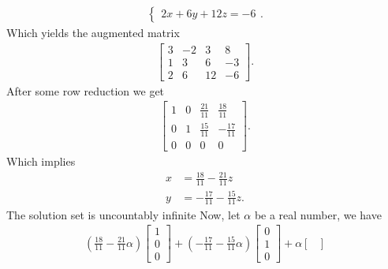 \documentclass{report}
\begin{document}
\begin{itemize}
\begin{align*}
\begin{cases}
                  2x + 6y + 12z = -6
               \end{cases}
            .\end{align*}
            Which yields the augmented matrix
            \begin{align*}
                \left[
                    \begin{array}{ccc|c}
                        3 & -2 & 3  & 8 \\
                        1 & 3 & 6 & -3 \\
                        2 & 6 & 12 & -6
                    \end{array}
                \right]
            .\end{align*}
            After some row reduction we get
            \begin{align*}
                \left[
                    \begin{array}{ccc|c}
                        1 & 0 & \frac{21}{11} & \frac{18}{11} \\
                        0 & 1 & \frac{15}{11} & -\frac{17}{11} \\
                        0 & 0 & 0 & 0 
                    \end{array}
                \right]
            .\end{align*}
            Which implies 
            \begin{align*}
                x &= \frac{18}{11} - \frac{21}{11}z \\
                y &= -\frac{17}{11}-\frac{15}{11}z
            .\end{align*}
            The solution set is uncountably infinite
            \bigbreak \noindent 
            Now, let $\alpha$ be a real number, we have
            \begin{align*}
                \left(\frac{18}{11} - \frac{21}{11}\alpha\right)
                \begin{bmatrix}
                    1 \\ 0 \\ 0 
                \end{bmatrix}
                + \left(-\frac{17}{11}-\frac{15}{11}\alpha\right)
                \begin{bmatrix}
                    0 \\ 1 \\ 0 
                \end{bmatrix}
               + \alpha
               \begin{bmatrix}

\end{bmatrix}
\end{align*}
\end{itemize}
\end{document}
